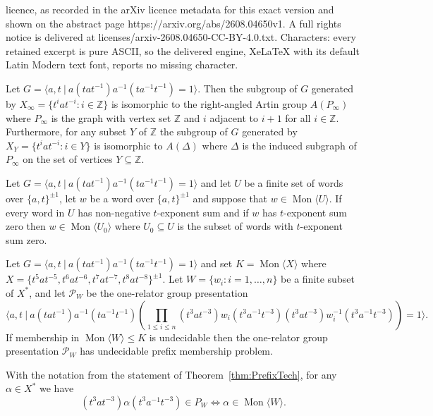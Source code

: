 \documentclass[10pt,a4paper]{amsart}
\newcommand{\Gpres}[2]{\bigl\langle #1\:|\:#2 \bigr\rangle}
\newcommand{\Mgen}[1]{\operatorname{Mon}\bigl\langle #1 \bigr\rangle}
\newcommand{\Z}{\mathbb{Z}}
\begin{document}
licence, as recorded in the arXiv licence metadata for this exact version and shown on the abstract page https://arxiv.org/abs/2608.04650v1. A full rights notice is delivered at licenses/arxiv-2608.04650-CC-BY-4.0.txt. Characters: every retained excerpt is pure ASCII, so the delivered engine, XeLaTeX with its default Latin Modern text font, reports no missing character.
\begin{lemma}\label{lem:APinfty} Let $G = \Gpres{a, t }{a(tat^{-1})a^{-1}(ta^{-1}t^{-1})= 1 }$. Then the subgroup of $G$ generated by $X_\infty = \{ t^{i} a t^{-i} : i \in \mathbb{Z} \} $ is isomorphic to 
the right-angled Artin group
$A(P_\infty)$ where $P_\infty$ is the graph with vertex set $\Z$ and $i$ adjacent to $i+1$ for all $i \in \mathbb{Z}$. 
Furthermore, for any subset $Y$ of $\Z$ the subgroup of $G$ generated by $X_Y = \{ t^i a t^{-i} : i \in Y \}$ is isomorphic to $A(\Delta)$ where $\Delta$ is the induced subgraph of $P_\infty$ on the set of vertices $Y \subseteq \Z$.     
\end{lemma}

\begin{lemma}\label{lem:UsefulTExpSum} 
Let $G = \Gpres{a, t }{a(tat^{-1})a^{-1}(ta^{-1}t^{-1})= 1 }$ and let 
$U$ be a finite set of words over $\{a,t\}^{\pm 1}$, let $w$ be a   
word over $\{a,t\}^{\pm 1}$ and suppose that $w \in \Mgen{U}$.   
If every word in $U$ has non-negative $t$-exponent sum and if $w$ has $t$-exponent sum zero then $w \in \Mgen{U_0}$ where $U_0 \subseteq U$ is the subset of words with $t$-exponent sum zero.          
\end{lemma}

\begin{theorem}\label{thm:PrefixTech} 
Let $G = \Gpres{a, t }{a(tat^{-1})a^{-1}(ta^{-1}t^{-1})= 1 }$   and set $K = \Mgen{X}$ where $X = \{ t^5at^{-5}, t^{6}at^{-6}, t^7at^{-7}, t^8at^{-8} \}^{\pm 1}$. Let $W = \{w_i: i=1,\ldots, n \}$ be a finite subset of    $X^*$,  and let $\mathcal{P}_W$ be the one-relator group presentation 
\[
\Gpres{a,t}{
a(tat^{-1})a^{-1}(ta^{-1}t^{-1})
\left(\prod_{1 \leq i \leq n}     
(t^3at^{-3})w_i(t^3a^{-1}t^{-3})(t^3at^{-3})w_i^{-1}(t^3a^{-1}t^{-3})
\right)= 1}.
\]
If membership in $\Mgen{W} \leq K$ is undecidable then the one-relator group presentation $\mathcal{P}_W$ has undecidable prefix membership problem.
  \end{theorem}

\begin{lemma}\label{la2}
With the notation from the statement of  Theorem~\ref{thm:PrefixTech}, 
for any $\alpha \in X^{*}$ we have 
\[ 
(t^3at^{-3})\alpha (t^3a^{-1}t^{-3}) \in P_{W} \Longleftrightarrow \alpha \in \Mgen{W}.
\]
\end{lemma}
\end{document}
